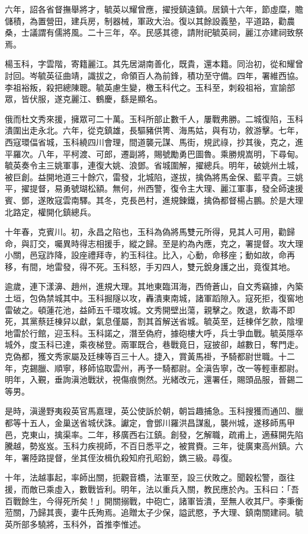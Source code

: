 \begin{pinyinscope}
六年，詔各省督撫舉將才，毓英以耀曾應，擢授鎮遠鎮。居鎮十六年，節虛糜，贍儲積，為置營田，建兵房，制器械，軍政大治。復以其餘設義塾，平道路，勸農桑，士議謂有儒將風。二十三年，卒。民感其德，請附祀毓英祠，麗江亦建祠致祭焉。

楊玉科，字雲階，寄籍麗江。其先居湖南善化，既貴，還本籍。同治初，從和耀曾討回。岑毓英征曲靖，識拔之，命領百人為前鋒，積功至守備。四年，署維西協。李祖裕叛，殺把總陳聰。毓英慮生變，檄玉科代之。玉科至，刺殺祖裕，宣諭部眾，皆伏服，遂克麗江、鶴慶，繇是顯名。

俄而杜文秀來援，擁眾可二十萬。玉科所部止數千人，屢戰弗勝。二城復陷，玉科潰圍出走永北。六年，從克鎮雄，長驅豬供箐、海馬姑，與有功，敘游擊。七年，西寇環偪省城，玉科繞四川會理，間道襲元謀、馬街，規武祿，抄其後，克之，進平羅次。八年，平柯渡、可郎，遷副將，賜號勵勇巴圖魯。乘勝規嵩明，下尋甸。毓英奏令主三姚軍事，連復大姚、浪鄧。省城圍解，擢總兵。明年，破姚州土城，被巨創。益開地道三十餘穴，雷發，北城陷，遂拔，擒偽將馬金保、藍平貴。三姚平，擢提督，易勇號瑚松額。無何，州西警，復令主大理、麗江軍事，發全師速援賓、鄧，遂敗寇雲南驛。其冬，克長邑村，進規鍊鐵，擒偽都督楊占鵬。於是大理北路定，權開化鎮總兵。

十年春，克賓川。初，永昌之陷也，玉科為偽將馬雙元所得，見其人可用，勸歸命，與訂交，囑異時得志相援手，縱之歸。至是約為內應，克之，署提督。攻大理小關，邑寇詐降，設座禮拜寺，約玉科往。比入，心動，命移座；動如故，命再移，有間，地雷發，得不死。玉科怒，手刃四人，雙元銳身護之出，竟復其地。

逾歲，連下漾濞、趙州，進規大理。其地東臨洱海，西倚蒼山，自文秀竊據，內築土垣，包偽禁城其中。玉科掘隧以攻，轟潰東南城，諸軍蹈隙入。寇死拒，復窖地雷破之。頓蓮花池，益師五千環攻城。文秀開壁出蕩，親擊之。敗退，飲毒不即死，其黨蔡廷棟舁以獻，氣息僅屬，割其首解送省城。毓英至，廷棟佯乞款，陰埋地雷於行館，迎玉科。玉科諾之，潛至偽府，據砲樓大呼，兵士爭血戰。毓英隱卒城外，度玉科已達，乘夜梯登。兩軍既合，巷戰竟日，寇披卻，越數日，奪門走。克偽都，獲文秀家屬及廷棟等百三十人。捷入，賞黃馬褂，予騎都尉世職。十二年，克錫臘、順寧，移師協取雲州，再予一騎都尉。全滇告寧，改一等輕車都尉。明年，入覲，垂詢滇池戰狀，視傷痕惻然。光緒改元，還署任，賜頭品服，晉錫二等男。

是時，滇邊野夷殺英官馬嘉理，英公使訴於朝，朝旨趣捕急。玉科搜獲而通凹、臘都等十五人，金巢送省城伏誅。讞定，會鄧川羅洪昌謀亂，襲州城，遂移師馬甲邑，克東山，擒渠率。二年，移廣西右江鎮。創發，乞解職，疏甫上，適蘇開先陷騰越，勢岌岌。玉科力疾視師，不百日悉平之，被賞賚。三年，徙廣東高州鎮。六年，署陸路提督，坐其侄汝楫仇殺知府孔昭鈖，鐫三級。尋復。

十年，法越事起，率師出關，扼觀音橋，法軍至，設三伏敗之。聞穀松警，亟往援，而敵已乘虛入，數戰皆利。明年，法以重兵入關，教民應於內。玉科曰：「吾百戰餘生，今得死所矣！」開關搦戰，中砲亡，諸軍皆潰，至無人收其尸。李秉衡蒞關，乃歸其喪，妻牛氏殉焉。追贈太子少保，謚武愍，予大理、鎮南關建祠。毓英所部多驍將，玉科外，首推李惟述。


\end{pinyinscope}
